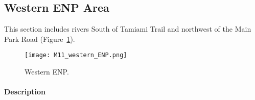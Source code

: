 \clearpage


\subsection{Western ENP Area}
This section includes rivers South of Tamiami Trail and northwest of the Main Park Road (Figure~\ref{fig:M11_western_ENP}).

\begin{figure}[!h]
  \begin{center}
  \texttt{[image: M11\_western\_ENP.png]}
  \caption{Western ENP.}
  \label{fig:M11_western_ENP}
  \end{center}
\end{figure}

\clearpage

\paragraph{Description}

